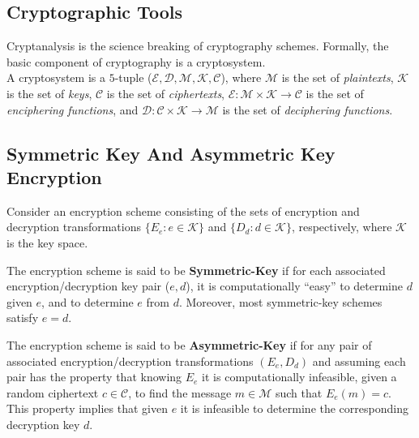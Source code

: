 \documentclass[%
  slidesonly,%
  semlayer%
  ]{seminar}                                  %
\newenvironment{defn}{\noindent \\ \noindent{\bf Defn:}}{\hspace*{\fill} \newline}
\begin{document}
\begin{slide}
\section*{Cryptographic Tools}
  Cryptanalysis is the science breaking of cryptography schemes.
  Formally, the basic component of cryptography is a cryptosystem.
  \begin{defn}
    A cryptosystem is a $5$-tuple ($ \mathcal{E,D,M,K,C}$), where $\mathcal{M}$ is the set of \textit{plaintexts}, $\mathcal{K}$ is the set of \textit{keys}, $\mathcal{C}$ is the set of \textit{ciphertexts}, $\mathcal{E}:\mathcal{M} \times \mathcal{K} \rightarrow \mathcal{C}$ is the set of \textit{enciphering functions}, and $\mathcal{D}:\mathcal{C} \times \mathcal{K} \rightarrow \mathcal{M}$ is the set of \textit{deciphering functions}.
  \end{defn}
  \clearpage

  \subsection*{Symmetric Key And Asymmetric Key Encryption}

    Consider an encryption scheme consisting of the sets of encryption and decryption transformations $\{E_{e}: e \in \mathcal{K}\}$ and $\{D_{d}: d \in \mathcal{K}\}$, respectively, where $\mathcal{K}$ is the key space.

    The encryption scheme is said to be \textbf{Symmetric-Key} if for each associated encryption/decryption key pair ($e,d$), it is computationally ``easy'' to determine $d$ given $e$, and to determine $e$ from $d$.
    Moreover, most symmetric-key schemes satisfy $e = d$.
    
    The encryption scheme is said to be \textbf{Asymmetric-Key} if for any pair of associated encryption/decryption transformations $(E_{e},D_{d})$ and assuming each pair has the property that knowing $E_{e}$ it is computationally infeasible, given a random ciphertext $c \in \mathcal{C}$, to find the message $m \in \mathcal{M}$ such that $E_{e}(m) = c$.
    This property implies that given $e$ it is infeasible to determine the corresponding decryption key $d$.

    \clearpage


\end{slide}
\end{document}
